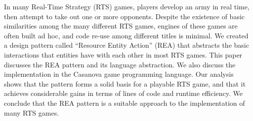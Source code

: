 In many Real-Time Strategy (RTS) games, players develop an army in real time, then attempt to take out one or more opponents. Despite the existence of basic similarities among the many different RTS games, engines of these games are often built ad hoc, and code re-use among different titles is minimal. We created a design pattern called ``Resource Entity Action'' (REA) that abstracts the basic interactions that entities have with each other in most RTS games. This paper discusses the REA pattern and its language abstraction. We also discuss the implementation in the Casanova game programming language. Our analysis shows that the pattern forms a solid basis for a playable RTS game, and that it achieves considerable gains in terms of lines of code and runtime efficiency. We conclude that the REA pattern is a suitable approach to the implementation of many RTS games. 